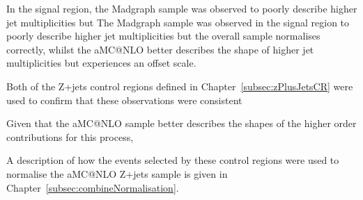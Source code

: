 In the signal region, the Madgraph sample was observed to poorly describe higher jet multiplicities but 
The Madgraph sample was observed in the signal region to poorly describe higher jet multiplicities but the overall sample normalises correctly, whilst the aMC@NLO better describes the shape of higher jet multiplicities but experiences an offset scale.

Both of the Z+jets control regions defined in Chapter~\ref{subsec:zPlusJetsCR} were used to confirm that these observations were consistent

Given that the aMC@NLO sample better describes the shapes of the higher order contributions for this process, 

A description of how the events selected by these control regions were used to normalise the aMC@NLO Z+jets sample is given in Chapter~\ref{subsec:combineNormalisation}.

